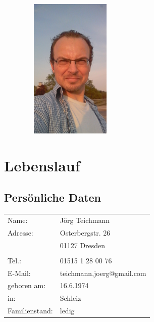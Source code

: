 \documentclass{article}
\begin{document}

\begin{figure}
    \includegraphics[width=1.5in]{Image.jpeg}

\end{figure}

\section*{Lebenslauf}

\subsection*{Pers\"onliche Daten}
\begin{tabular}{lp{15cm}}
Name: 		& J\"org Teichmann\\
Adresse: 	& Osterbergstr. 26\\
	 		& 01127 Dresden\\
\\
Tel.:		& 01515 1 28 00 76 \\
E-Mail:  	& teichmann.joerg@gmail.com \\
geboren am: & 16.6.1974\\
in:	    	& Schleiz\\
Familienstand: 	& ledig
\end{tabular}
\end{document}

